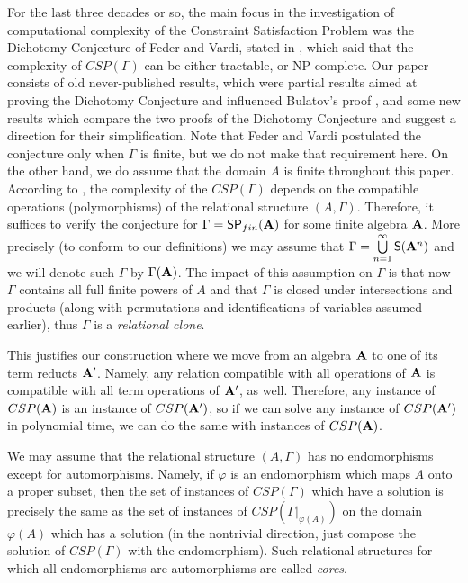 \documentclass[11pt]{amsart}
\newcommand{\m}[1]{{\uppercase {\mathbf {#1}}}}
\newcommand{\subp}{{\sf {SP}}}
\newcommand{\sub}{{\sf {S}}}
\theoremstyle{definition}
\begin{document}
For the last three decades or so, the main focus in the investigation of computational complexity of the Constraint Satisfaction Problem was the Dichotomy Conjecture of Feder and Vardi, stated in \cite{FV}, which said that the complexity of $CSP(\Gamma)$ can be either tractable, or NP-complete. Our paper consists of old never-published results, which were partial results aimed at proving the Dichotomy Conjecture and influenced Bulatov's proof \cite{Budich}, and some new results which compare the two proofs of the Dichotomy Conjecture and suggest a direction for their simplification. Note that Feder and Vardi postulated the conjecture only when $\Gamma$ is finite, but we do not make that requirement here. On the other hand, we do assume that the domain $A$ is finite throughout this paper. According to \cite{J}, the complexity of the $CSP(\Gamma)$ depends on the compatible operations (polymorphisms) of the relational structure $(A,\Gamma)$. Therefore, it suffices to verify the conjecture for $\Gamma=\subp_{fin}(\m a)$ for some finite algebra $\m a$. More precisely (to conform to our definitions) we may assume that $\Gamma=\bigcup\limits_{n=1}^\infty\sub(\m a^n)$ and we will denote such $\Gamma$ by $\Gamma(\m a)$. The impact of this assumption on $\Gamma$ is that now $\Gamma$ contains all full finite powers of $A$ and that $\Gamma$ is closed under intersections and products (along with permutations and identifications of variables assumed earlier), thus $\Gamma$ is a {\em relational clone}.

This justifies our construction where we move from an algebra $\m a$ to one of its term reducts $\m a'$. Namely, any relation compatible with all operations of $\m a$ is compatible with all term operations of $\m a'$, as well. Therefore, any instance of $CSP(\m a)$ is an instance of $CSP(\m a')$, so if we can solve any instance of $CSP(\m a')$ in polynomial time, we can do the same with instances of $CSP(\m a)$.

We may assume that the relational structure $(A,\Gamma)$ has no endomorphisms except for automorphisms. Namely, if $\varphi$ is an endomorphism which maps $A$ onto a proper subset, then the set of instances of $CSP(\Gamma)$ which have a solution is precisely the same as the set of instances of $CSP(\Gamma|_{\varphi(A)})$ on the domain $\varphi(A)$ which has a solution (in the nontrivial direction, just compose the solution of $CSP(\Gamma)$ with the endomorphism). Such relational structures for which all endomorphisms are automorphisms are called {\em cores}.
\end{document}

